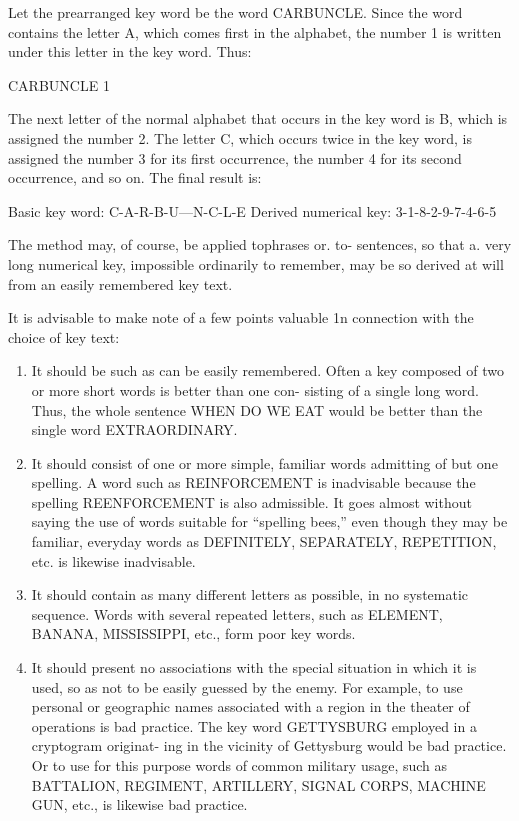 \mypara Let the prearranged key word be the word CARBUNCLE. Since
the word contains the letter A, which comes first in the alphabet, the
number 1 is written under this letter in the key word. Thus:

CARBUNCLE
 1


The next letter of the normal alphabet that occurs in the key word is B,
which is assigned the number 2. The letter C, which occurs twice in the
key word, is assigned the number 3 for its first occurrence, the number 4
for its second occurrence, and so on. The final result is:

Basic key word: C-A-R-B-U—N-C-L-E
Derived numerical key: 3-1-8-2-9-7-4-6-5

\mypara The method may, of course, be applied tophrases or. to- sentences,
so that a. very long numerical key, impossible ordinarily to remember,
may be so derived at will from an easily remembered key text.

\mypara It is advisable to make note of a few points valuable 1n connection
with the choice of key text:

\begin{enumerate}
\item It should be such as can be easily remembered. Often a key
composed of two or more short words is better than one con-
sisting of a single long word. Thus, the whole sentence WHEN
DO WE EAT would be better than the single word
EXTRAORDINARY.

\item It should consist of one or more simple, familiar words admitting of but one spelling. A word such as REINFORCEMENT
is inadvisable because the spelling REENFORCEMENT is
also admissible. It goes almost without saying the use of words
suitable for “spelling bees,” even though they may be familiar,
everyday words as DEFINITELY, SEPARATELY, REPETITION, etc. is likewise inadvisable.

\item It should contain as many different letters as possible, in no
systematic sequence. Words with several repeated letters, such
as ELEMENT, BANANA, MISSISSIPPI, etc., form poor
key words.

\item It should present no associations with the special situation in
which it is used, so as not to be easily guessed by the enemy.
For example, to use personal or geographic names associated
with a region in the theater of operations is bad practice. The
key word GETTYSBURG employed in a cryptogram originat-
ing in the vicinity of Gettysburg would be bad practice. Or to
use for this purpose words of common military usage, such as
BATTALION, REGIMENT, ARTILLERY, SIGNAL
CORPS, MACHINE GUN, etc., is likewise bad practice.
\end{enumerate}

